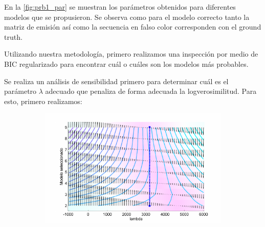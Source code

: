 En la \autoref{fig:prb1_par} se muestran los parámetros obtenidos para diferentes modelos que se propusieron. Se observa como para el modelo correcto tanto la matriz de emisión así como la secuencia en falso color corresponden con el ground truth.

Utilizando nuestra metodología, primero realizamos una inspección por medio de BIC regularizado para encontrar cuál o cuáles son los modelos más probables. 

Se realiza un análisis de sensibilidad primero para determinar cuál es el parámetro $\lambda$ adecuado que penaliza de forma adecuada la logverosimilitud. Para esto, primero realizamos: 

\begin{figure}[H]
  \begin{center}
  \begin{subfigure}[t]{0.5\textwidth}
   \includegraphics[height=\textwidth]{gfx/chap6/cuervobic2}
   \caption{}
  \end{subfigure} \\ \qquad
  \begin{subfigure}[b]{0.5\textwidth}

\end{subfigure}
\end{center}
\end{figure}
